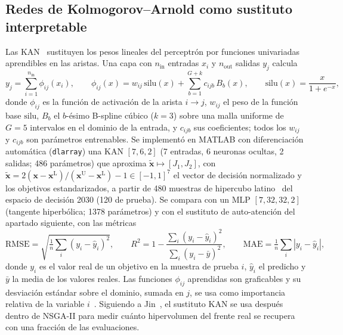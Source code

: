 \documentclass[11pt,a4paper]{article}
\newcommand{\vect}[1]{\bm{#1}}
\begin{document}
\subsection{Redes de Kolmogorov--Arnold como sustituto interpretable}
\label{sec:kan}
Las KAN~\cite{liu2024kan} sustituyen los pesos lineales del perceptr\'on por funciones
univariadas aprendibles en las aristas. Una capa con $n_{\mathrm{in}}$ entradas
$x_i$ y $n_{\mathrm{out}}$ salidas $y_j$ calcula
\begin{equation}
y_j = \sum_{i=1}^{n_{\mathrm{in}}}\phi_{ij}(x_i),\qquad
\phi_{ij}(x) = w_{ij}\,\mathrm{silu}(x) + \sum_{b=1}^{G+k} c_{ijb}\,B_b(x),\qquad
\mathrm{silu}(x)=\frac{x}{1+e^{-x}},
\label{eq:kan}
\end{equation}
donde $\phi_{ij}$ es la funci\'on de activaci\'on de la arista $i\to j$, $w_{ij}$ el peso
de la funci\'on base $\mathrm{silu}$, $B_b$ el $b$-\'esimo B-spline c\'ubico ($k=3$) sobre una
malla uniforme de $G=5$ intervalos en el dominio de la entrada, y $c_{ijb}$ sus
coeficientes; todos los $w_{ij}$ y $c_{ijb}$ son par\'ametros entrenables. Se implement\'o en
MATLAB con diferenciaci\'on autom\'atica (\texttt{dlarray}) una KAN $[7,6,2]$ (7 entradas,
6 neuronas ocultas, 2 salidas; 486 par\'ametros) que aproxima
$\tilde{\vect{x}}\mapsto[J_1,J_2]$, con $\tilde{\vect{x}}=2(\vect{x}-\vect{x}^{\mathrm{L}})/(\vect{x}^{\mathrm{U}}-\vect{x}^{\mathrm{L}})-1\in[-1,1]^7$
el vector de decisi\'on normalizado y los objetivos estandarizados, a partir de 480
muestras de hipercubo latino~\cite{mckay1979} del espacio de decisi\'on 2030 (120 de
prueba). Se compara con un MLP $[7,32,32,2]$ (tangente hiperb\'olica; 1378 par\'ametros)
y con el sustituto de auto-atenci\'on del apartado siguiente, con las m\'etricas
\begin{equation}
\mathrm{RMSE}=\sqrt{\tfrac{1}{n}\textstyle\sum_i(y_i-\hat y_i)^2},\qquad
R^2 = 1-\frac{\sum_i(y_i-\hat y_i)^2}{\sum_i(y_i-\bar y)^2},\qquad
\mathrm{MAE}=\tfrac{1}{n}\textstyle\sum_i|y_i-\hat y_i|,
\label{eq:metricas}
\end{equation}
donde $y_i$ es el valor real de un objetivo en la muestra de prueba $i$, $\hat y_i$ el
predicho y $\bar y$ la media de los valores reales. Las funciones $\phi_{ij}$ aprendidas
son graficables y su desviaci\'on est\'andar sobre el dominio, sumada en $j$, se usa como
importancia relativa de la variable $i$~\cite{vaca2024}. Siguiendo a Jin~\cite{jin2011},
el sustituto KAN se usa despu\'es dentro de NSGA-II para medir cu\'anto hipervolumen del
frente real se recupera con una fracci\'on de las evaluaciones.
\end{document}
